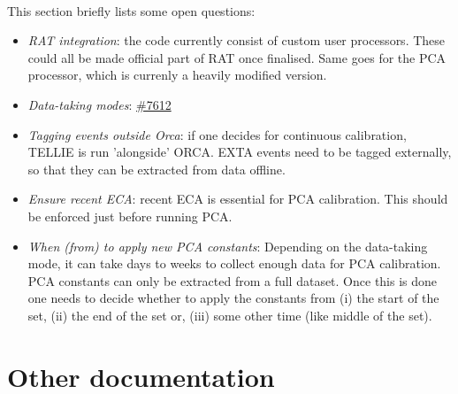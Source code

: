 \documentclass[12pt]{article}
\begin{document}
\paragraph{}
This section briefly lists some open questions:
\begin{itemize}
	\item \textit{RAT integration}: the code currently consist of custom user processors. These could all be made official part of RAT once finalised. Same goes for the PCA processor, which is currenly a heavily modified version.
	\item \textit{Data-taking modes}: \href{https://www.snolab.ca/snoplus/private/DocDB/cgi/ShowDocument?docid=7612}{\#7612}
	\item \textit{Tagging events outside Orca}: if one decides for continuous calibration, TELLIE is run 'alongside' ORCA. EXTA events need to be tagged externally, so that they can be extracted from data offline.
	\item \textit{Ensure recent ECA}: recent ECA is essential for PCA calibration. This should be enforced just before running PCA.
	\item \textit{When (from) to apply new PCA constants}: Depending on the data-taking mode, it can take days to weeks to collect enough data for PCA calibration. PCA constants can only be extracted from a full dataset. Once this is done one needs to decide whether to apply the constants from (i) the start of the set, (ii) the end of the set or, (iii) some other time (like middle of the set).
\end{itemize}

\section{Other documentation}
\end{document}
